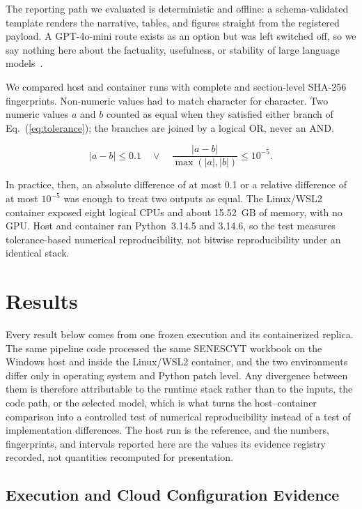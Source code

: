 \documentclass[runningheads]{llncs}
\begin{document}
            The reporting path we evaluated is deterministic and offline: a schema-validated template renders the narrative, tables, and figures straight from the registered payload. A GPT-4o-mini route exists as an option but was left switched off, so we say nothing here about the factuality, usefulness, or stability of large language models~\cite{ref20}.

            We compared host and container runs with complete and section-level SHA-256 fingerprints. Non-numeric values had to match character for character. Two numeric values $a$ and $b$ counted as equal when they satisfied either branch of Eq.~(\ref{eq:tolerance}); the branches are joined by a logical OR, never an AND.

            \begin{equation}
                |a-b|\leq 0.1
                \quad \lor \quad
                \frac{|a-b|}{\max(|a|,|b|)}\leq 10^{-5}.
                \label{eq:tolerance}
            \end{equation}

            In practice, then, an absolute difference of at most 0.1 or a relative difference of at most $10^{-5}$ was enough to treat two outputs as equal. The Linux/WSL2 container exposed eight logical CPUs and about 15.52~GB of memory, with no GPU. Host and container ran Python~3.14.5 and 3.14.6, so the test measures tolerance-based numerical reproducibility, not bitwise reproducibility under an identical stack.

    \section{Results}
        Every result below comes from one frozen execution and its containerized replica. The same pipeline code processed the same SENESCYT workbook on the Windows host and inside the Linux/WSL2 container, and the two environments differ only in operating system and Python patch level. Any divergence between them is therefore attributable to the runtime stack rather than to the inputs, the code path, or the selected model, which is what turns the host--container comparison into a controlled test of numerical reproducibility instead of a test of implementation differences. The host run is the reference, and the numbers, fingerprints, and intervals reported here are the values its evidence registry recorded, not quantities recomputed for presentation.

        \subsection{Execution and Cloud Configuration Evidence}
\end{document}
